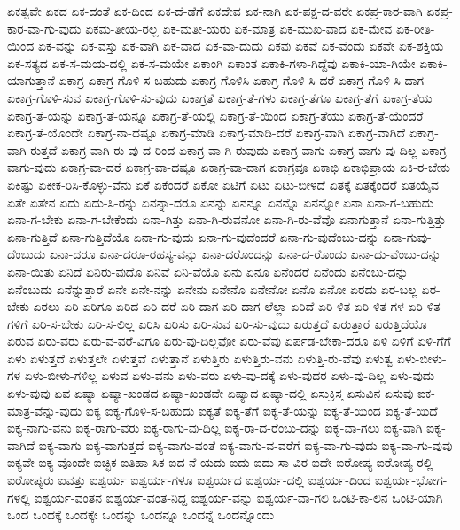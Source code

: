 {ಏಕತ್ವವೇ
ಏಕದ
ಏಕ-ದಂತೆ
ಏಕ-ದಿಂದ
ಏಕ-ದೆ-ಡೆಗೆ
ಏಕದೇವ
ಏಕ-ನಾಗಿ
ಏಕ-ಪಕ್ಷ-ದ-ವರೇ
ಏಕಪ್ರ-ಕಾರ-ವಾಗಿ
ಏಕಪ್ರ-ಕಾರ-ವಾ-ಗು-ವುದು
ಏಕಮ-ತೀಯ-ರಲ್ಲ
ಏಕ-ಮತೀ-ಯರು
ಏಕ-ಮಾತ್ರ
ಏಕ-ಮುಖ-ವಾದ
ಏಕ-ಮೇವ
ಏಕ-ರೀತಿ-ಯಿಂದ
ಏಕ-ವನ್ನು
ಏಕ-ವಸ್ತು
ಏಕ-ವಾಗಿ
ಏಕ-ವಾದ
ಏಕ-ವಾ-ದುದು
ಏಕವು
ಏಕವೆ
ಏಕ-ವೆಂದು
ಏಕವೇ
ಏಕ-ಶಕ್ತಿಯ
ಏಕ-ಸತ್ಯದ
ಏಕ-ಸ-ಮಯ-ದಲ್ಲಿ
ಏಕ-ಸ-ಮಯೇ
ಏಕಾಂಗಿ
ಏಕಾಂತ
ಏಕಾಕಿ-ಗಳಾ-ಗಿದ್ದೆವು
ಏಕಾಕಿ-ಯಾ-ಗಿಯೇ
ಏಕಾಕಿ-ಯಾಗುತ್ತಾನೆ
ಏಕಾಗ್ರ
ಏಕಾಗ್ರ-ಗೊಳಿ-ಸ-ಬಹುದು
ಏಕಾಗ್ರ-ಗೊಳಿಸಿ
ಏಕಾಗ್ರ-ಗೊಳಿ-ಸಿ-ದರೆ
ಏಕಾಗ್ರ-ಗೊಳಿ-ಸಿ-ದಾಗ
ಏಕಾಗ್ರ-ಗೊಳಿ-ಸುವ
ಏಕಾಗ್ರ-ಗೊಳಿ-ಸು-ವುದು
ಏಕಾಗ್ರತೆ
ಏಕಾಗ್ರ-ತೆ-ಗಳು
ಏಕಾಗ್ರ-ತೆಗೂ
ಏಕಾಗ್ರ-ತೆಗೆ
ಏಕಾಗ್ರ-ತೆಯ
ಏಕಾಗ್ರ-ತೆ-ಯನ್ನು
ಏಕಾಗ್ರ-ತೆ-ಯನ್ನೂ
ಏಕಾಗ್ರ-ತೆ-ಯಲ್ಲಿ
ಏಕಾಗ್ರ-ತೆ-ಯಿಂದ
ಏಕಾಗ್ರ-ತೆಯು
ಏಕಾಗ್ರ-ತೆ-ಯೆಂದರೆ
ಏಕಾಗ್ರ-ತೆ-ಯೊಂದೇ
ಏಕಾಗ್ರ-ನಾ-ದಷ್ಟೂ
ಏಕಾಗ್ರ-ಮಾಡಿ
ಏಕಾಗ್ರ-ಮಾಡಿ-ದರೆ
ಏಕಾಗ್ರ-ವಾಗಿ
ಏಕಾಗ್ರ-ವಾಗಿದೆ
ಏಕಾಗ್ರ-ವಾಗಿ-ರುತ್ತದೆ
ಏಕಾಗ್ರ-ವಾಗಿ-ರು-ವು-ದ-ರಿಂದ
ಏಕಾಗ್ರ-ವಾ-ಗಿ-ರುವುದು
ಏಕಾಗ್ರ-ವಾಗು
ಏಕಾಗ್ರ-ವಾಗು-ವು-ದಿಲ್ಲ
ಏಕಾಗ್ರ-ವಾಗು-ವುದು
ಏಕಾಗ್ರ-ವಾ-ದರೆ
ಏಕಾಗ್ರ-ವಾ-ದಷ್ಟೂ
ಏಕಾಗ್ರ-ವಾ-ದಾಗ
ಏಕಾಗ್ರವೂ
ಏಕಾಭಿ
ಏಕಾಭಿಪ್ರಾಯ
ಏಕಿ-ರ-ಬೇಕು
ಏಕಿಷ್ಟು
ಏಕೀಕ-ರಿಸಿ-ಕೊಳ್ಳು-ವೆನು
ಏಕೆ
ಏಕೆಂದರೆ
ಏಕೋ
ಏಟಿಗೆ
ಏಟು
ಏಟು-ಬೀಳದೆ
ಏತಕ್ಕೆ
ಏತಕ್ಕೆಂದರೆ
ಏತಯೈವ
ಏತೇ
ಏತೇನ
ಏದು
ಏದು-ಸಿ-ರನ್ನು
ಏನನ್ನಾ-ದರೂ
ಏನನ್ನು
ಏನನ್ನೂ
ಏನನ್ನೊ
ಏನನ್ನೋ
ಏನಾ
ಏನಾ-ಗ-ಬಹುದು
ಏನಾ-ಗ-ಬೇಕು
ಏನಾ-ಗ-ಬೇಕೆಂದು
ಏನಾ-ಗಿತ್ತು
ಏನಾ-ಗಿ-ರುವನೋ
ಏನಾ-ಗಿ-ರು-ವೆವೊ
ಏನಾಗುತ್ತಾನೆ
ಏನಾ-ಗುತ್ತಿತ್ತು
ಏನಾ-ಗುತ್ತಿದೆ
ಏನಾ-ಗುತ್ತಿದೆಯೊ
ಏನಾ-ಗು-ವುದು
ಏನಾ-ಗು-ವುದೆಂದರೆ
ಏನಾ-ಗು-ವುದೆಂಬು-ದನ್ನು
ಏನಾ-ಗುವು-ದೆಂಬುದು
ಏನಾ-ದರೂ
ಏನಾ-ದರೂ-ರಹಸ್ಯ-ವನ್ನು
ಏನಾ-ದರೊಂದನ್ನು
ಏನಾ-ದ-ರೊಂದು
ಏನಾ-ದು-ವೆಂಬು-ದನ್ನು
ಏನಾ-ಯಿತು
ಏನಿದೆ
ಏನಿರು-ವುದೊ
ಏನಿವೆ
ಏನಿ-ವೆಯೊ
ಏನು
ಏನೂ
ಏನೆಂದರೆ
ಏನೆಂದು
ಏನೆಂಬು-ದನ್ನು
ಏನೆಂಬುದು
ಏನೆನ್ನುತ್ತಾರೆ
ಏನೇ
ಏನೇ-ನನ್ನು
ಏನೇನು
ಏನೇನೊ
ಏನೇನೋ
ಏನೊ
ಏನೋ
ಏರದು
ಏರ-ಬಲ್ಲ
ಏರ-ಬೇಕು
ಏರಲು
ಏರಿ
ಏರಿಗೂ
ಏರಿದ
ಏರಿ-ದರೆ
ಏರಿ-ದಾಗ
ಏರಿ-ದಾಗ-ಲೆಲ್ಲಾ
ಏರಿದೆ
ಏರಿ-ಳಿತ
ಏರಿ-ಳಿತ-ಗಳ
ಏರಿ-ಳಿತ-ಗಳಿಗೆ
ಏರಿ-ಸ-ಬೇಕು
ಏರಿ-ಸ-ಲಿಲ್ಲ
ಏರಿಸಿ
ಏರಿಸು
ಏರಿ-ಸುವ
ಏರಿ-ಸು-ವುದು
ಏರುತ್ತದೆ
ಏರುತ್ತಾರೆ
ಏರುತ್ತಿದೆಯೊ
ಏರುವ
ಏರು-ವರು
ಏರು-ವ-ವರೆ-ವಿಗೂ
ಏರು-ವು-ದಿಲ್ಲವೋ
ಏರು-ವೆವು
ಏರ್ಪಡ-ಬೇಕಾ-ದರೂ
ಏಳಿ
ಏಳಿಗೆ
ಏಳಿ-ಗೆಗೆ
ಏಳು
ಏಳುತ್ತದೆ
ಏಳುತ್ತಲೇ
ಏಳುತ್ತವೆ
ಏಳುತ್ತಾನೆ
ಏಳುತ್ತಿರು
ಏಳುತ್ತಿರು-ವನು
ಏಳುತ್ತಿ-ರು-ವೆವು
ಏಳುತ್ವ
ಏಳು-ಬೀಳು-ಗಳ
ಏಳು-ಬೀಳು-ಗಳಿಲ್ಲ
ಏಳುವ
ಏಳು-ವನು
ಏಳು-ವರು
ಏಳು-ವು-ದಕ್ಕೆ
ಏಳು-ವುದರ
ಏಳು-ವು-ದಿಲ್ಲ
ಏಳು-ವುದು
ಏಳು-ವುವು
ಏವ
ಏಷ್ಯಾ
ಏಷ್ಯಾ-ಖಂಡದ
ಏಷ್ಯಾ-ಖಂಡವೇ
ಏಷ್ಯಾದ
ಏಷ್ಯಾ-ದಲ್ಲಿ
ಏಸುಕ್ರಿಸ್ತ
ಏಸುವಿನ
ಏಸುವು
ಐಕ-ಮಾತ್ರ-ವೆನ್ನು-ವುದು
ಐಕ್ಯ
ಐಕ್ಯ-ಗೊಳಿ-ಸ-ಬಹುದು
ಐಕ್ಯತೆ
ಐಕ್ಯ-ತೆಗೆ
ಐಕ್ಯ-ತೆ-ಯನ್ನು
ಐಕ್ಯ-ತೆ-ಯಿಂದ
ಐಕ್ಯ-ತೆ-ಯಿದೆ
ಐಕ್ಯ-ನಾಗು-ವನು
ಐಕ್ಯ-ರಾಗು-ವರು
ಐಕ್ಯ-ರಾಗು-ವು-ದಿಲ್ಲ
ಐಕ್ಯ-ರಾ-ದ-ರೆಂಬು-ದನ್ನು
ಐಕ್ಯ-ವಾ-ಗಲು
ಐಕ್ಯ-ವಾಗಿ
ಐಕ್ಯ-ವಾಗಿದೆ
ಐಕ್ಯ-ವಾಗು
ಐಕ್ಯ-ವಾಗುತ್ತದೆ
ಐಕ್ಯ-ವಾಗು-ವಂತೆ
ಐಕ್ಯ-ವಾಗು-ವ-ವರೆಗೆ
ಐಕ್ಯ-ವಾ-ಗು-ವುದು
ಐಕ್ಯ-ವಾ-ಗು-ವುವು
ಐಕ್ಯವೇ
ಐಕ್ಯ-ವೊಂದೇ
ಐಚ್ಛಿಕ
ಐತಿಹಾ-ಸಿಕ
ಐದ-ನೆ-ಯದು
ಐದು
ಐದು-ಸಾ-ವಿರ
ಐದೇ
ಐರೋಪ್ಯ
ಐರೋಪ್ಯ-ರಲ್ಲಿ
ಐರೋಪ್ಯರು
ಐವತ್ತು
ಐಶ್ವರ್ಯ
ಐಶ್ವರ್ಯ-ಗಳೂ
ಐಶ್ವರ್ಯದ
ಐಶ್ವರ್ಯ-ದಲ್ಲಿ
ಐಶ್ವರ್ಯ-ದಿಂದ
ಐಶ್ವರ್ಯ-ಭೋಗ-ಗಳಲ್ಲಿ
ಐಶ್ವರ್ಯ-ವಂತನ
ಐಶ್ವರ್ಯ-ವಂತ-ನಿದ್ದ
ಐಶ್ವರ್ಯ-ವನ್ನು
ಐಶ್ವರ್ಯ-ವಾ-ಗಲಿ
ಒಂಟಿ-ಕಾ-ಲಿನ
ಒಂಟಿ-ಯಾಗಿ
ಒಂದ
ಒಂದಕ್ಕೆ
ಒಂದಕ್ಕೇ
ಒಂದನ್ನು
ಒಂದನ್ನೂ
ಒಂದನ್ನೆ
ಒಂದನ್ನೊಂದು
}
